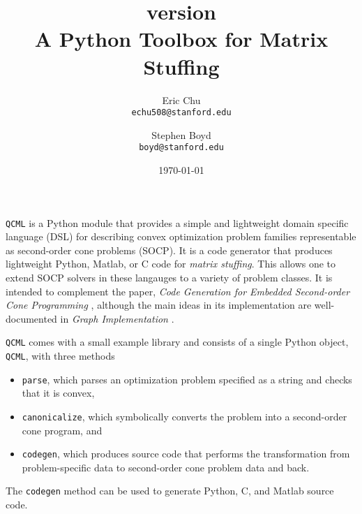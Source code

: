 \documentclass[11pt]{article}
\title{\qcml version \qcmlver \\
A Python Toolbox for Matrix Stuffing}
\author{
Eric Chu\\\texttt{echu508@stanford.edu}
\and
Stephen Boyd\\\texttt{boyd@stanford.edu}
}
\date{\today}
\def\qcml{\texttt{QCML}\xspace}
\begin{document}
  \maketitle
  
\qcml is a Python module that provides a simple and lightweight domain
specific language (DSL) for describing convex optimization problem families
representable as second-order cone problems (SOCP). It is a code generator
that produces lightweight Python, Matlab, or C code for \emph{matrix
stuffing}. This allows one to extend SOCP solvers in these langauges to a 
variety of problem classes. It is intended to complement the paper, 
\emph{Code Generation for Embedded Second-order Cone Programming} \cite{ECC}, 
although the main ideas in its
implementation are well-documented in \emph{Graph Implementation}
\cite{Grant}.

\qcml comes with a small example library and consists of a single Python
object, \texttt{QCML}, with three methods
\begin{itemize}
\item \texttt{parse}, which parses an optimization problem specified as a
string and checks that it is convex,
\item \texttt{canonicalize}, which symbolically converts the problem into
a second-order cone program, and
\item \texttt{codegen}, which produces source code that performs the
transformation from problem-specific data to second-order cone problem data
and back.
\end{itemize}
The \texttt{codegen} method can be used to generate Python, C, and Matlab
source code.
\end{document}
